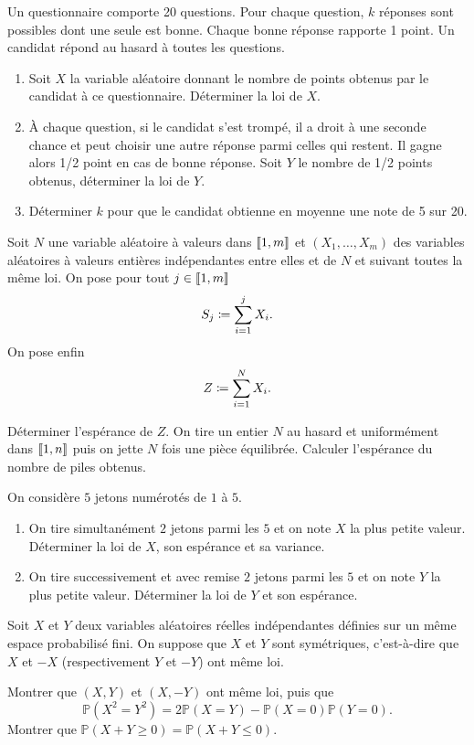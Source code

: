 \documentclass{magnolia}
\begin{document}
Un questionnaire comporte 20 questions. Pour chaque question, $k$ réponses  sont possibles dont une seule est bonne. Chaque bonne réponse rapporte 1 point. Un candidat répond au hasard à toutes les questions.
\begin{enumerate}
\item Soit $X$ la variable aléatoire donnant le nombre de points obtenus par le candidat à ce questionnaire. Déterminer la loi de $X$.
\item À chaque question, si le candidat s'est trompé, il a droit à une seconde chance et peut choisir une  autre réponse parmi celles qui restent. Il gagne alors 1/2 point en cas de bonne réponse. Soit $Y$ le nombre de 1/2 points obtenus, déterminer la loi de $Y$.
\item Déterminer $k$ pour que le candidat obtienne en moyenne une note de 5 sur 20.
\end{enumerate}

Soit $N$ une variable aléatoire à valeurs dans $\left\llbracket 1,m\right\rrbracket$ et $(X_1,\dots,X_m)$ des variables aléatoires à valeurs entières indépendantes entre elles et de $N$ et suivant toutes la même loi.
On pose pour tout $j \in \left\llbracket 1,m\right\rrbracket$
\[S_j\coloneqq\sum\limits_{i=1}^j X_i.\]
On pose enfin
$$Z\coloneqq\sum\limits_{i=1}^N X_i.$$
\begin{questions}
\question Déterminer l'espérance de $Z$. %
\question On tire un entier $N$ au hasard et uniformément dans $\left\llbracket 1,n\right\rrbracket$
puis on jette $N$ fois une pièce équilibrée. Calculer l'espérance %
du nombre de piles obtenus.
\end{questions}

On considère $5$ jetons numérotés de $1$ à $5$.
\begin{enumerate}
\item On tire simultanément $2$ jetons parmi les $5$ et on note $X$ la plus
petite valeur.
Déterminer la loi de $X$, son espérance et sa variance.
\item On tire successivement et avec remise $2$ jetons parmi les $5$ et on note $Y$ la plus petite valeur.
Déterminer la loi de $Y$ et son espérance.
\end{enumerate}


Soit $X$ et $Y$ deux variables aléatoires réelles indépendantes définies sur un même
espace probabilisé fini. On suppose que $X$ et $Y$ sont symétriques, c'est-à-dire que
$X$ et $-X$ (respectivement $Y$ et $-Y$) ont même loi.
\begin{questions}
\question Montrer que $(X,Y)$ et $(X,-Y)$ ont même loi, puis que
  \[\mathbb{P}(X^2=Y^2)=2\mathbb{P}(X=Y)-\mathbb{P}(X=0)\mathbb{P}(Y=0).\]
\question Montrer que $\mathbb{P}(X+Y\geq 0)=\mathbb{P}(X+Y\leq 0)$.
\end{questions}
\end{document}
